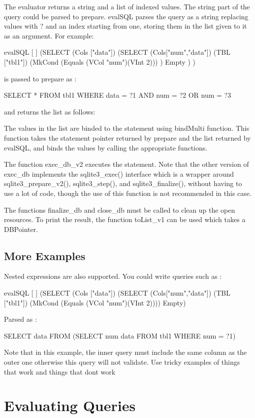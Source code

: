 \documentclass[11pt]{article}
\begin{document}
The evaluator returns a string and a list of indexed values.
The string part of the query could be parsed to prepare. 
evalSQL parses the query as a string replacing values with ? and an index starting from one,
storing them in the list given to it as an argument.
For example:


evalSQL [ ] (SELECT (Cols ["data"]) (SELECT (Cols["num","data"]) (TBL ["tbl1"]) (MkCond (Equals (VCol "num")(VInt 2))) ) Empty ) )

is passed to prepare as :

SELECT * FROM tbl1 WHERE data = ?1 AND num = ?2 OR num = ?3

and returns the list as follows:

The values in the list are binded to the statement using bindMulti function.
This function takes the statement pointer returned by prepare and the list returned by evalSQL, 
and binds the values by calling the appropriate functions.

The function exec\_db\_v2 executes the statement.
Note that the other version of exec\_db implements the sqlite3\_exec() interface which is a wrapper
around sqlite3\_prepare\_v2(), sqlite3\_step(), and sqlite3\_finalize(),
without having to use a lot of code, though the use of this function is not recommended in this case.

The functions finalize\_db and close\_db must be called to clean up the open resources.
To print the result, the function toList\_v1 can be used which takes a DBPointer.

\subsection{More Examples}
\label{More Examples}
Nested expressions are also supported. You could write queries such as :

evalSQL [ ] (SELECT (Cols ["data"]) (SELECT (Cols["num","data"]) (TBL ["tbl1"]) (MkCond (Equals (VCol "num")(VInt 2)))) Empty)

Parsed as :

SELECT data FROM (SELECT num data FROM tbl1 WHERE num = ?1)

Note that in this example, the inner query must include the same column as the outer one otherwise this query will not validate.
Use tricky examples of things that work and things that dont work

\section{Evaluating Queries}
\label{Evaluating Queries}
\end{document}
